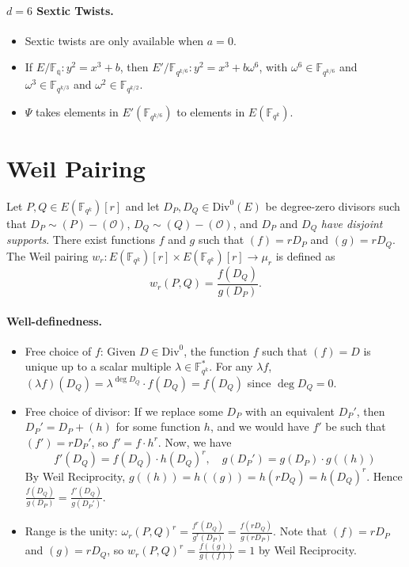 \paragraph{$d=6$ Sextic Twists.}

\begin{itemize}
	\item Sextic twists are only available when $a = 0$.
	\item If $E/\mathbb{F_q}: y^2 = x^3 + b$, then $E'/\mathbb{F}_{q^{k/6}}: y^2 = x^3 + b\omega^6$, with $\omega^6 \in \mathbb{F}_{q^{k/6}}$ and $\omega^3 \in \mathbb{F}_{q^{k/3}}$ and $\omega^2 \in \mathbb{F}_{q^{k/2}}$.
	\item $\Psi$ takes elements in $E'(\mathbb{F}_{q^{k/6}})$ to elements in $E(\mathbb{F}_{q^k})$.
\end{itemize}

\section{Weil Pairing}

\begin{definition}
Let $P, Q \in E(\mathbb{F}_{q^k})[r]$ and let $D_P, D_Q \in \text{Div}^0(E)$ be degree-zero divisors such that $D_P \sim (P) - (\mathcal{O})$, $D_Q \sim (Q) - (\mathcal{O})$, and $D_P$ and $D_Q$ \emph{have disjoint supports}. There exist functions $f$ and $g$ such that $(f) = rD_P$ and $(g) = rD_Q$.
The Weil pairing $w_r: E(\mathbb{F}_{q^k})[r] \times  E(\mathbb{F}_{q^k})[r] \to \mu_r$ is defined as
\[
	w_r(P, Q) = \frac{f(D_Q)}{g(D_P)}.
\]
\end{definition}

\paragraph{Well-definedness.}

\begin{itemize}

\item Free choice of $f$: Given $D \in \text{Div}^0$, the function $f$ such that $(f) = D$ is unique up to a scalar multiple $\lambda \in \mathbb{F}_{q^k}^*$. For any $\lambda f$, $(\lambda f)(D_Q) = \lambda^{\deg D_Q} \cdot f(D_Q) = f(D_Q)$ since $\deg D_Q = 0$.
	
\item Free choice of divisor: If we replace some $D_P$ with an equivalent $D_P'$, then $D_P' = D_P + (h)$ for some function $h$, and we would have $f'$ be such that $(f') = r D_P'$, so $f' = f \cdot h^r$. Now, we have      
\[
	f'(D_Q) = f(D_Q) \cdot h(D_Q)^r, \quad g(D_P') = g(D_P) \cdot g((h))
\]        
By Weil Reciprocity, $g((h)) = h((g)) = h(r D_Q) = h(D_Q)^r$. Hence $\frac{f(D_Q)}{g(D_P)} = \frac{f'(D_Q)}{g(D_{P}')}$.
        
\item Range is the unity: $\omega_r(P,Q)^r = \frac{f^r(D_Q)}{g^r(D_P)} = \frac{f(rD_Q)}{g(rD_P)}$. Note that $(f) = rD_P$ and $(g) = rD_Q$, so $w_r(P,Q)^r = \frac{f((g))}{g((f))} = 1$ by Weil Reciprocity.

\end{itemize}

